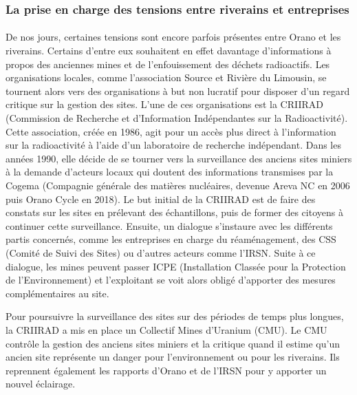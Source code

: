 \documentclass{article}
\begin{document}
\subsubsection{La prise en charge des tensions entre riverains et entreprises}
\paragraph{} De nos jours, certaines tensions sont encore parfois présentes entre Orano et les riverains. Certains d'entre eux souhaitent en effet davantage d’informations à propos des anciennes mines et de l'enfouissement des déchets radioactifs. Les organisations locales, comme l’association Source et Rivière du Limousin, se tournent alors vers des organisations à but non lucratif pour disposer d'un regard critique sur la gestion des sites. 
L’une de ces organisations est la CRIIRAD (Commission de Recherche et d'Information Indépendantes sur la Radioactivité). Cette association, créée en 1986, agit pour un accès plus direct à l’information sur la radioactivité à l’aide d’un laboratoire de recherche indépendant. Dans les années 1990, elle décide de se tourner vers la surveillance des anciens sites miniers à la demande d’acteurs locaux qui doutent des informations transmises par la Cogema (Compagnie générale des matières nucléaires, devenue Areva NC en 2006 puis Orano Cycle en 2018). Le but initial de la CRIIRAD est de faire des constats sur les sites en prélevant des échantillons, puis de former des citoyens à continuer cette surveillance. Ensuite, un dialogue s'instaure avec les différents partis concernés, comme les entreprises en charge du réaménagement, des CSS (Comité de Suivi des Sites) ou d’autres acteurs comme l’IRSN. Suite à ce dialogue, les mines peuvent passer ICPE (Installation Classée pour la Protection de l'Environnement) et l’exploitant se voit alors obligé d’apporter des mesures complémentaires au site.

Pour poursuivre la surveillance des sites sur des périodes de temps plus longues, la CRIIRAD a mis en place un Collectif Mines d’Uranium (CMU). Le CMU contrôle la gestion des anciens sites miniers et la critique quand il estime qu'un ancien site représente un danger pour l'environnement ou pour les riverains. Ils reprennent également les rapports d’Orano et de l’IRSN pour y apporter un nouvel éclairage.
\end{document}
